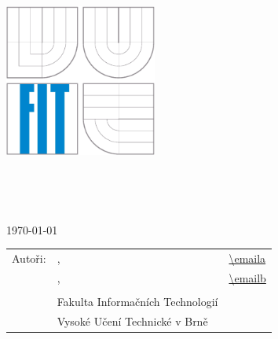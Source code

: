 \begin{titlepage}
	\begin{center}
		\includegraphics[height=5cm]{img/logo.eps}
	\end{center}
	\vfill
	\begin{center}
		\begin{Large}
			\docname\\
		\end{Large}
		\bigskip
		\begin{Huge}
			\projname\\
		\end{Huge}
	\end{center}
	\vfill
	\begin{center}
		\begin{large}
			\today
		\end{large}
	\end{center}
	\vfill
	\begin{flushleft}
		\begin{large}
			\begin{tabular}{lll}
				Autoři: & \authora, & \url{\emaila} \\
				        & \authorb, & \url{\emailb} \\
				& & \\
				& Fakulta Informačních Technologií \\
				& Vysoké Učení Technické v Brně \\
			\end{tabular}
		\end{large}
	\end{flushleft}
\end{titlepage}
